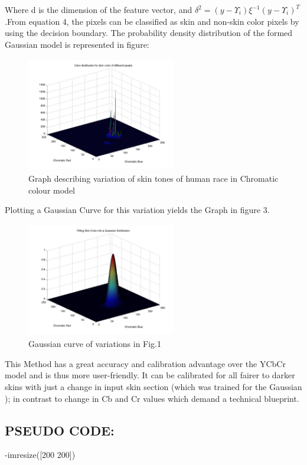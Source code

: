 \documentclass[conference]{IEEEtran}
\begin{document}
Where d is the dimension of the feature vector, and \linebreak
$\delta^2 =(y - \Upsilon_i)\xi^{-1}(y - \Upsilon_i)^T $ .From equation 4, the pixels can be classified as skin and non-skin color pixels by using the decision boundary. The probability density distribution of the formed Gaussian model is represented in figure:
\begin{figure}[h!]
	\centering
	\includegraphics[width = 6.5cm, height = 5cm]{skincolor}
	\caption{ Graph describing variation of skin tones of human race in Chromatic colour model}
\end{figure}
Plotting a Gaussian Curve for this variation yields the Graph in figure 3.
\begin{figure}[h!]
	\centering
	\includegraphics[width = 6.5cm, height = 5cm]{gaussian}
	\caption{Gaussian curve of variations in Fig.1}
\end{figure}

This Method has a great accuracy and calibration advantage over the YCbCr model and is thus more user-friendly. It can be calibrated for all fairer to darker skins with just a change in input skin section (which was trained for the Gaussian ); in contrast to change in Cb and Cr values which demand a technical blueprint.

\subsection{PSEUDO CODE:}
-imresize([200 200]) 
\end{document}
